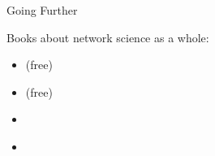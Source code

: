 \documentclass[a4paper,11pt]{book}
\begin{document}
\begin{textbox}{Going Further}

Books about network science as a whole:
\begin{itemize}
    \item\cite{barabasi2016network} (free)
    \item \cite{coscia2021atlas} (free)
    \item \cite{zinoviev2018complex}
    \item \cite{menczer2020first}
\end{itemize}

\end{textbox}


\end{document}
